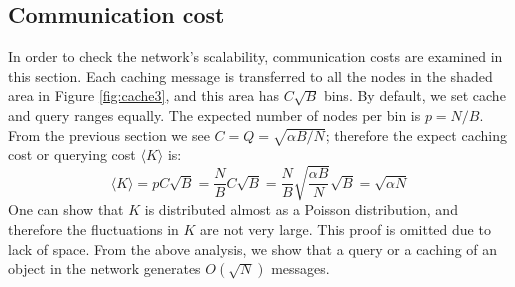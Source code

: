 \documentclass[conference]{IEEEtran}
\begin{document}
\subsection{Communication cost}
In order to check the network's scalability, communication costs
are examined in this section. Each caching message is transferred to all the
nodes in the shaded area in Figure \ref{fig:cache3}, and this area has
$C\sqrt{B}$ bins. By default, we set cache and query ranges equally.
The expected number of nodes per bin is $p=N/B$.
From the previous section we see
$C = Q = \sqrt{\alpha B/N}$; therefore the expect caching cost or querying
cost $\langle K\rangle$ is:
\begin{equation*}\label{th}
\langle K\rangle = pC\sqrt{B} = \frac{N}{B}C\sqrt{B} = \frac{N}{B}\sqrt{\frac{\alpha B}{N}}\sqrt{B}
= \sqrt{\alpha N}
\end{equation*}
One can show that $K$ is distributed almost as a Poisson distribution, and
therefore the fluctuations in $K$ are not very large.  This proof is omitted
due to lack of space.
From the above analysis, we show that a query or a caching of an object in the network
generates $O(\sqrt{N})$ messages.
\end{document}
